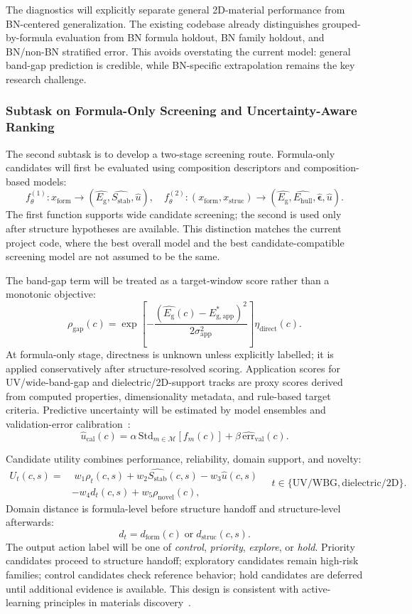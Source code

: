 \documentclass[12pt,a4paper]{article}
\newcommand{\eg}{E_{\mathrm{g}}}
\newcommand{\ehull}{E_{\mathrm{hull}}}
\newcommand{\form}{x_{\mathrm{form}}}
\newcommand{\struc}{x_{\mathrm{struc}}}
\newcommand{\unc}{u}
\newcommand{\stab}{S_{\mathrm{stab}}}
\newcommand{\domainf}{d_{\mathrm{form}}}
\newcommand{\domains}{d_{\mathrm{struc}}}
\newcommand{\utility}{U}
\newcommand{\gapscore}{\rho_{\mathrm{gap}}}
\newcommand{\novel}{\rho_{\mathrm{novel}}}
\begin{document}
The diagnostics will explicitly separate general 2D-material performance from BN-centered generalization. The existing codebase already distinguishes grouped-by-formula evaluation from BN formula holdout, BN family holdout, and BN/non-BN stratified error. This avoids overstating the current model: general band-gap prediction is credible, while BN-specific extrapolation remains the key research challenge.

\subsubsection{Subtask on Formula-Only Screening and Uncertainty-Aware Ranking}
The second subtask is to develop a two-stage screening route. Formula-only candidates will first be evaluated using composition descriptors and composition-based models:
\[
  f_{\theta}^{(1)}:\form\rightarrow(\hat{\eg},\hat{\stab},\hat{\unc}),
  \quad
  f_{\theta}^{(2)}:(\form,\struc)\rightarrow
  (\hat{\eg},\hat{\ehull},\hat{\boldsymbol{\epsilon}},\hat{\unc}).
\]
The first function supports wide candidate screening; the second is used only after structure hypotheses are available. This distinction matches the current project code, where the best overall model and the best candidate-compatible screening model are not assumed to be the same.

The band-gap term will be treated as a target-window score rather than a monotonic objective:
\[
  \gapscore(c)=
  \exp\!\left[-\frac{(\hat{\eg}(c)-E^*_{\mathrm{g,app}})^2}{2\sigma_{\mathrm{app}}^2}\right]\eta_{\mathrm{direct}}(c).
\]
At formula-only stage, directness is unknown unless explicitly labelled; it is applied conservatively after structure-resolved scoring. Application scores for UV/wide-band-gap and dielectric/2D-support tracks are proxy scores derived from computed properties, dimensionality metadata, and rule-based target criteria. Predictive uncertainty will be estimated by model ensembles and validation-error calibration~\cite{gal2016_dropout,lakshminarayanan2017_ensembles}:
\[
  \hat{\unc}_{\mathrm{cal}}(c)=
  \alpha\,\mathrm{Std}_{m\in\mathcal{M}}[f_m(c)]
  +\beta\,\widehat{\mathrm{err}}_{\mathrm{val}}(c).
\]

Candidate utility combines performance, reliability, domain support, and novelty:
\[
  \begin{aligned}
  \utility_t(c,s)=&\;w_1\rho_t(c,s)+w_2\hat{\stab}(c,s)-w_3\hat{\unc}(c,s)\\
  &-w_4 d_t(c,s)+w_5\novel(c),
  \end{aligned}
  \quad t\in\{\mathrm{UV/WBG},\mathrm{dielectric/2D}\}.
\]
Domain distance is formula-level before structure handoff and structure-level afterwards:
\[
  d_t=\domainf(c)\;\mathrm{or}\;\domains(c,s).
\]
The output action label will be one of \textit{control}, \textit{priority}, \textit{explore}, or \textit{hold}. Priority candidates proceed to structure handoff; exploratory candidates remain high-risk families; control candidates check reference behavior; hold candidates are deferred until additional evidence is available. This design is consistent with active-learning principles in materials discovery~\cite{lookman2019_active}.
\end{document}
